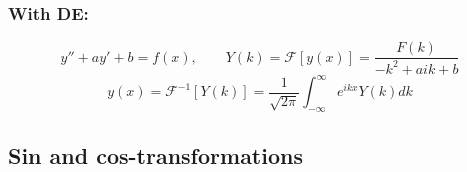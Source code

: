 \documentclass[a4paper,norsk, 10pt]{article}
\begin{document}
\subsubsection{With DE:}
\begin{equation}
y'' + ay' + b = f(x), \qquad Y(k) = \mathcal{F}[y(x)] = \frac{F(k)}{-k^2 + aik + b}
\end{equation}
\begin{equation}
y(x) = \mathcal{F}^{-1}[Y(k)] = \frac{1}{\sqrt{2\pi}}\int_{-\infty}^{\infty}e^{ikx}Y(k) dk
\end{equation}
\subsection{Sin and cos-transformations}
\end{document}
